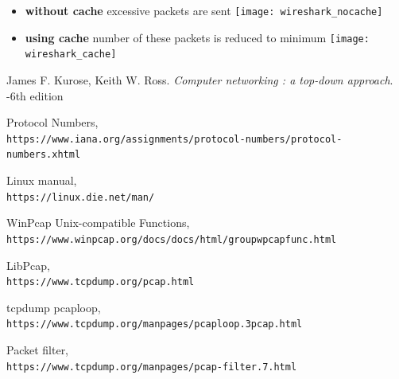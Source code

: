 \documentclass{article}
\begin{document}
\begin{itemize}
  \item \textbf{without cache} excessive packets are sent\newline
  \texttt{[image: wireshark\_nocache]}
 \item \textbf{using cache} number of these packets is reduced to minimum\newline
  \texttt{[image: wireshark\_cache]}
\end{itemize}
\newpage


\begin{thebibliography}{9}

James F. Kurose, Keith W. Ross. 
\textit{Computer networking : a top-down approach}. 
-6th edition

Protocol Numbers,
\\\texttt{https://www.iana.org/assignments/protocol-numbers/protocol-numbers.xhtml}

Linux manual,
\\\texttt{https://linux.die.net/man/}

WinPcap Unix-compatible Functions,
\\\texttt{https://www.winpcap.org/docs/docs/html/group\textunderscore \textunderscore wpcapfunc.html}

LibPcap,
\\\texttt{https://www.tcpdump.org/pcap.html}

tcpdump pcap\textunderscore loop,
\\\texttt{https://www.tcpdump.org/manpages/pcap\textunderscore loop.3pcap.html}

Packet filter,
\\\texttt{https://www.tcpdump.org/manpages/pcap-filter.7.html}

\end{thebibliography}

	
	
\end{document}
